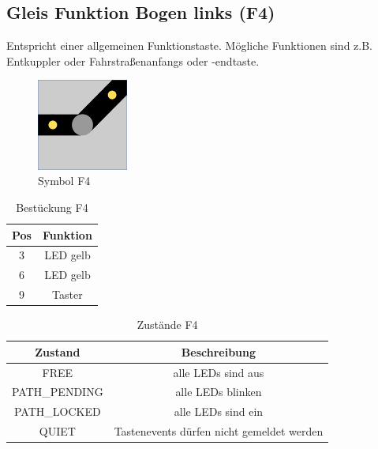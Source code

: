 \documentclass[10pt,a4paper]{article}
\begin{document}
\subsection{Gleis Funktion Bogen links (F4)}
Entspricht einer allgemeinen Funktionstaste. Mögliche Funktionen sind z.B. Entkuppler oder Fahrstraßenanfangs oder -endtaste.
\begin{figure}[hbtp]
\centering
\includegraphics[width=3cm]{../folien/f4.png}
\caption{Symbol F4}
\end{figure}
\begin{table}[h!]
\centering
\begin{tabular}{c|c}
\textbf{Pos} & \textbf{Funktion} \\ \hline
3 & LED gelb \\
6 & LED gelb \\
9 & Taster
\end{tabular}
\caption{Bestückung F4}
\end{table}
\begin{table}[h!]
\centering
\begin{tabular}{c|c}
\textbf{Zustand} & \textbf{Beschreibung} \\ \hline
FREE & alle LEDs sind aus \\
PATH\_PENDING & alle LEDs blinken \\
PATH\_LOCKED & alle LEDs sind ein \\
QUIET & Tastenevents dürfen nicht gemeldet werden
\end{tabular}
\caption{Zustände F4}
\end{table}

\newpage
\end{document}
